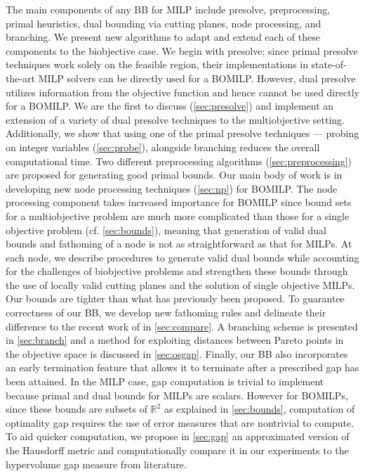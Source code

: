 \documentclass[11.5pt]{article}
\newcommand{\bb}{BB}
\newcommand{\R}{\mathbb{R}}
\begin{document}
The main components of any \bb{} for MILP include presolve, preprocessing, primal heuristics, dual bounding via cutting planes, node processing, and branching. We present new algorithms to adapt and extend each of these components to the biobjective case. We begin with presolve; since primal presolve techniques work solely on the feasible region, their implementations in state-of-the-art MILP solvers can be directly used for a BOMILP. However, dual presolve utilizes information from the objective function and hence cannot be used directly for a BOMILP. We are the first to discuss (\textsection\ref{sec:presolve}) and implement an extension of a variety of dual presolve techniques to the multiobjective setting. Additionally, we show that using one of the primal presolve techniques --- probing on integer variables (\textsection\ref{sec:probe}), alongside branching reduces the overall computational time. Two different preprocessing algorithms (\textsection\ref{sec:preprocessing}) are proposed for generating good primal bounds. Our main body of work is in developing new node processing techniques (\textsection\ref{sec:np}) for BOMILP.  The node processing component takes increased importance for BOMILP since bound sets for a multiobjective problem are much more complicated than those for a single objective problem (cf. \textsection\ref{sec:bounds}), meaning that generation of valid dual bounds and fathoming of a node is not as straightforward as that for MILPs. At each node, we describe procedures to generate valid dual bounds while accounting for the challenges of biobjective problems and strengthen these bounds through the use of locally valid cutting planes and the solution of single objective MILPs. Our bounds are tighter than what has previously been proposed. To guarantee correctness of our \bb{}, we develop new fathoming rules and delineate their difference to the recent work of \citet{belotti2016fathoming} in \textsection\ref{sec:compare}. A branching scheme is presented in \textsection\ref{sec:branch} and a method for exploiting distances between Pareto points in the objective space is discussed in \textsection\ref{sec:osgap}. Finally, our \bb{} also incorporates an early termination feature that allows it to terminate after a prescribed gap has been attained. In the MILP case, gap computation is trivial to implement because primal and dual bounds for MILPs are scalars. However for BOMILPs, since these bounds are subsets of $\R^{2}$ as explained in \textsection\ref{sec:bounds}, computation of optimality gap requires the use of error measures that are nontrivial to compute. To aid quicker computation, we propose in \textsection\ref{sec:gap} an approximated version of the Hausdorff metric and computationally compare it in our experiments to the hypervolume gap measure from literature.
\end{document}
